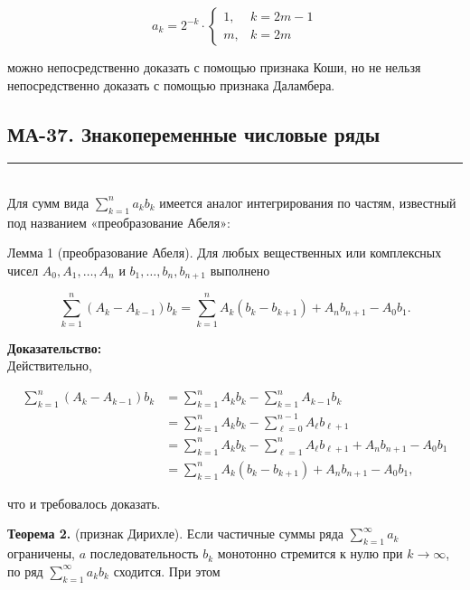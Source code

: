\documentclass[a4paper,12pt]{article} %
\newcommand{\HRule}{\rule{\linewidth}{0.5mm}}
\begin{document}
	$$
	a_{k}=2^{-k} \cdot \begin{cases}1, & k=2 m-1 \\ m, & k=2 m\end{cases}
	$$
	
	можно непосредственно доказать с помощью признака Коши, но не нельзя непосредственно доказать с помощью признака Даламбера.
	

	\newpage

	\begin{LARGE}
		\begin{center}
			\section{МА-37. Знакопеременные числовые ряды }
		\end{center}
	\end{LARGE}
	\HRule \\

	Для сумм вида $\sum_{k=1}^{n} a_{k} b_{k}$ имеется аналог интегрирования по частям, известный под названием «преобразование Абеля»:
	
	Лемма 1 (преобразование Абеля). Для любых вещественных или комплексных чисел $A_{0}, A_{1}, \ldots, A_{n}$ и $b_{1}, \ldots, b_{n}, b_{n+1}$ выполнено
	
	$$
	\sum_{k=1}^{n}\left(A_{k}-A_{k-1}\right) b_{k}=\sum_{k=1}^{n} A_{k}\left(b_{k}-b_{k+1}\right)+A_{n} b_{n+1}-A_{0} b_{1} .
	$$
	
	\textbf{Доказательство:\\}
	Действительно,
	
	$$
	\begin{aligned}
	\sum_{k=1}^{n}\left(A_{k}-A_{k-1}\right) b_{k} & =\sum_{k=1}^{n} A_{k} b_{k}-\sum_{k=1}^{n} A_{k-1} b_{k} \\
	& =\sum_{k=1}^{n} A_{k} b_{k}-\sum_{\ell=0}^{n-1} A_{\ell} b_{\ell+1} \\
	& =\sum_{k=1}^{n} A_{k} b_{k}-\sum_{\ell=1}^{n} A_{\ell} b_{\ell+1}+A_{n} b_{n+1}-A_{0} b_{1} \\
	& =\sum_{k=1}^{n} A_{k}\left(b_{k}-b_{k+1}\right)+A_{n} b_{n+1}-A_{0} b_{1},
	\end{aligned}
	$$
	
	что и требовалось доказать.
	
	\textbf{Теорема 2.} (признак Дирихле). Если частичные суммы ряда $\sum_{k=1}^{\infty} a_{k}$ ограничены, $a$ последовательность $b_{k}$ монотонно стремится к нулю при $k \rightarrow \infty$, по ряд $\sum_{k=1}^{\infty} a_{k} b_{k}$ сходится. При этом
	
\end{document}
